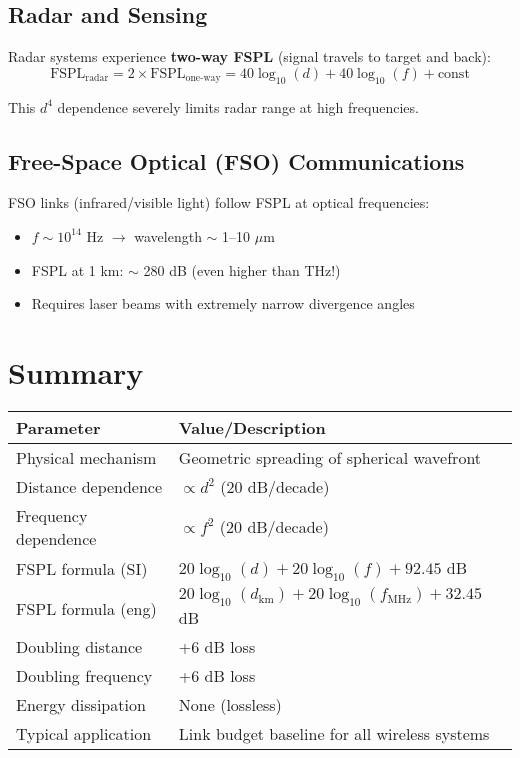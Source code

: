 \subsection{Radar and Sensing}

Radar systems experience \textbf{two-way FSPL} (signal travels to target and back):
\begin{equation}
\text{FSPL}_{\text{radar}} = 2 \times \text{FSPL}_{\text{one-way}} = 40\log_{10}(d) + 40\log_{10}(f) + \text{const}
\end{equation}

This $d^4$ dependence severely limits radar range at high frequencies.

\subsection{Free-Space Optical (FSO) Communications}

FSO links (infrared/visible light) follow FSPL at optical frequencies:
\begin{itemize}
\item $f \sim 10^{14}$ Hz $\rightarrow$ wavelength $\sim$ 1--10 $\mu$m
\item FSPL at 1 km: $\sim$ 280 dB (even higher than THz!)
\item Requires laser beams with extremely narrow divergence angles
\end{itemize}

\section{Summary}
\label{sec:summary}

\begin{center}
\begin{tabular}{@{}ll@{}}
\toprule
\textbf{Parameter} & \textbf{Value/Description} \\
\midrule
Physical mechanism & Geometric spreading of spherical wavefront \\
Distance dependence & $\propto d^2$ (20 dB/decade) \\
Frequency dependence & $\propto f^2$ (20 dB/decade) \\
FSPL formula (SI) & $20\log_{10}(d) + 20\log_{10}(f) + 92.45$ dB \\
FSPL formula (eng) & $20\log_{10}(d_{\text{km}}) + 20\log_{10}(f_{\text{MHz}}) + 32.45$ dB \\
Doubling distance & +6 dB loss \\
Doubling frequency & +6 dB loss \\
Energy dissipation & None (lossless) \\
Typical application & Link budget baseline for all wireless systems \\
\bottomrule
\end{tabular}
\end{center}


